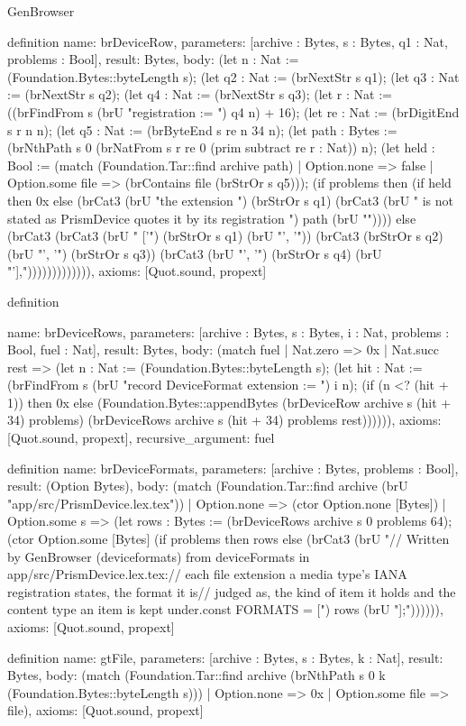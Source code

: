 \begin{lexlean}{GenBrowser}
\begin{semanticmodule}
{{definition{
  name: brDeviceRow,
  parameters: [archive : Bytes, s : Bytes, q1 : Nat, problems : Bool],
  result: Bytes,
  body: (let n : Nat := (Foundation.Bytes::byteLength s); (let q2 : Nat := (brNextStr s q1); (let q3 : Nat := (brNextStr s q2); (let q4 : Nat := (brNextStr s q3); (let r : Nat := ((brFindFrom s (brU "registration := ") q4 n) + 16); (let re : Nat := (brDigitEnd s r n n); (let q5 : Nat := (brByteEnd s re n 34 n); (let path : Bytes := (brNthPath s 0 (brNatFrom s r re 0 (prim subtract re r : Nat)) n); (let held : Bool := (match (Foundation.Tar::find archive path)
    | Option.none => false
    | Option.some file => (brContains file (brStrOr s q5))); (if problems then (if held then 0x else (brCat3 (brU "the extension ") (brStrOr s q1) (brCat3 (brU " is not stated as PrismDevice quotes it by its registration ") path (brU "\n")))) else (brCat3 (brCat3 (brU "  ['") (brStrOr s q1) (brU "', '")) (brCat3 (brStrOr s q2) (brU "', '") (brStrOr s q3)) (brCat3 (brU "', '") (brStrOr s q4) (brU "'],\n"))))))))))))),
  axioms: [Quot.sound, propext]
}

definition{
  name: brDeviceRows,
  parameters: [archive : Bytes, s : Bytes, i : Nat, problems : Bool, fuel : Nat],
  result: Bytes,
  body: (match fuel
    | Nat.zero => 0x
    | Nat.succ rest => (let n : Nat := (Foundation.Bytes::byteLength s); (let hit : Nat := (brFindFrom s (brU "record DeviceFormat {extension := ") i n); (if (n <? (hit + 1)) then 0x else (Foundation.Bytes::appendBytes (brDeviceRow archive s (hit + 34) problems) (brDeviceRows archive s (hit + 34) problems rest)))))),
  axioms: [Quot.sound, propext],
  recursive_argument: fuel
}

definition{
  name: brDeviceFormats,
  parameters: [archive : Bytes, problems : Bool],
  result: (Option Bytes),
  body: (match (Foundation.Tar::find archive (brU "app/src/PrismDevice.lex.tex"))
    | Option.none => (ctor Option.none [Bytes])
    | Option.some s => (let rows : Bytes := (brDeviceRows archive s 0 problems 64); (ctor Option.some [Bytes] (if problems then rows else (brCat3 (brU "// Written by GenBrowser (deviceformats) from deviceFormats in app/src/PrismDevice.lex.tex:\n// each file extension a media type's IANA registration states, the format it is\n// judged as, the kind of item it holds and the content type an item is kept under.\n\nexport const FORMATS = [\n") rows (brU "];\n")))))),
  axioms: [Quot.sound, propext]
}

definition{
  name: gtFile,
  parameters: [archive : Bytes, s : Bytes, k : Nat],
  result: Bytes,
  body: (match (Foundation.Tar::find archive (brNthPath s 0 k (Foundation.Bytes::byteLength s)))
    | Option.none => 0x
    | Option.some file => file),
  axioms: [Quot.sound, propext]
}

}}}
\end{semanticmodule}
\end{lexlean}
